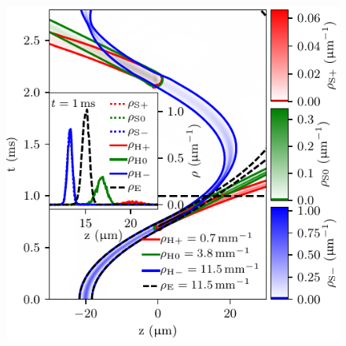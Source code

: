 {\begin{figure}
{    \includegraphics{figures/hidden_variables/hvsc/trajectories.pdf}
    }

\end{figure}}
